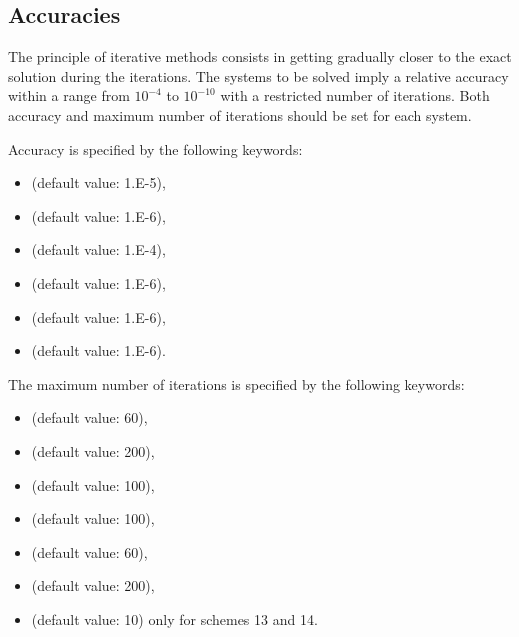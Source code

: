 \subsection{Accuracies}
\label{sec:accuracy}
The principle of iterative methods consists in getting gradually closer to the
exact solution during the iterations. The systems to be solved imply a relative
accuracy within a range from $10^{-4}$ to $10^{-10}$ with a restricted
number of iterations. Both accuracy and maximum number of iterations should be
set for each system.

Accuracy is specified by the following keywords:

\begin{itemize}
\item {} (default value: 1.E-5),

\item {} (default value: 1.E-6),

\item {} (default value: 1.E-4),

\item {} (default value: 1.E-6),

\item {} (default value: 1.E-6),

\item {} (default value: 1.E-6).
\end{itemize}

The maximum number of iterations is specified by the following keywords:

\begin{itemize}
\item {}(default value: 60),

\item {} (default value:
200),

\item {} (default value: 100),

\item {} (default
value: 100),

\item {}(default
value: 60),

\item {}(default
value: 200),

\item {}(default
value: 10) only for schemes 13 and 14.
\end{itemize}

